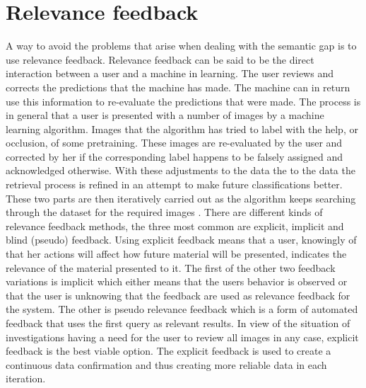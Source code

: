 \section{Relevance feedback}
\label{sec:theory:relfeed}
A way to avoid the problems that arise when dealing with the semantic gap is to use relevance feedback. 
Relevance feedback can be said to be the direct interaction between a user and a machine in learning. 
The user reviews and corrects the predictions that the machine has made. The machine can in return use this information to re-evaluate the predictions that were made.
The process is in general that a user is presented with a number of images by a machine learning algorithm. Images that the algorithm has tried to label with the help, or occlusion, of some pretraining. These images are re-evaluated by the user and corrected by her if the corresponding label happens to be falsely assigned and acknowledged otherwise. With these adjustments to the data the to the data the retrieval process is refined in an attempt to make future classifications better. These two parts are then iteratively carried out as the algorithm keeps searching through the dataset for the required images \cite{IRJET2017relevancefeedback}. There are different kinds of relevance feedback methods, the three most common are explicit, implicit and blind (pseudo) feedback. Using explicit feedback means that a user, knowingly of that her actions will affect how future material will be presented, indicates the relevance of the material presented to it. The first of the other two feedback variations is implicit which either means that the users behavior is observed or that the user is unknowing that the feedback are used as relevance feedback for the system. The other is pseudo relevance feedback which is a form of automated feedback that uses the first query as relevant results. In view of the situation of investigations having a need for the user to review all images in any case, explicit feedback is the best viable option. The explicit feedback is used to create a continuous data confirmation and thus creating more reliable data in each iteration.


